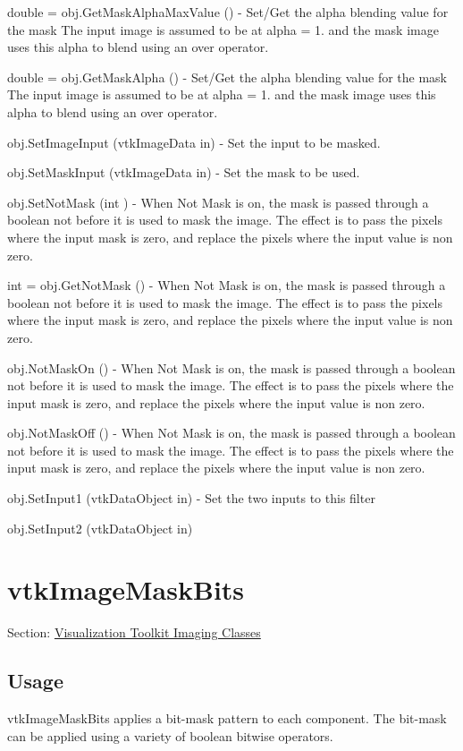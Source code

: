 \begin{DoxyItemize}
\item {\ttfamily double = obj.\-Get\-Mask\-Alpha\-Max\-Value ()} -\/ Set/\-Get the alpha blending value for the mask The input image is assumed to be at alpha = 1. and the mask image uses this alpha to blend using an over operator.  
\item {\ttfamily double = obj.\-Get\-Mask\-Alpha ()} -\/ Set/\-Get the alpha blending value for the mask The input image is assumed to be at alpha = 1. and the mask image uses this alpha to blend using an over operator.  
\item {\ttfamily obj.\-Set\-Image\-Input (vtk\-Image\-Data in)} -\/ Set the input to be masked.  
\item {\ttfamily obj.\-Set\-Mask\-Input (vtk\-Image\-Data in)} -\/ Set the mask to be used.  
\item {\ttfamily obj.\-Set\-Not\-Mask (int )} -\/ When Not Mask is on, the mask is passed through a boolean not before it is used to mask the image. The effect is to pass the pixels where the input mask is zero, and replace the pixels where the input value is non zero.  
\item {\ttfamily int = obj.\-Get\-Not\-Mask ()} -\/ When Not Mask is on, the mask is passed through a boolean not before it is used to mask the image. The effect is to pass the pixels where the input mask is zero, and replace the pixels where the input value is non zero.  
\item {\ttfamily obj.\-Not\-Mask\-On ()} -\/ When Not Mask is on, the mask is passed through a boolean not before it is used to mask the image. The effect is to pass the pixels where the input mask is zero, and replace the pixels where the input value is non zero.  
\item {\ttfamily obj.\-Not\-Mask\-Off ()} -\/ When Not Mask is on, the mask is passed through a boolean not before it is used to mask the image. The effect is to pass the pixels where the input mask is zero, and replace the pixels where the input value is non zero.  
\item {\ttfamily obj.\-Set\-Input1 (vtk\-Data\-Object in)} -\/ Set the two inputs to this filter  
\item {\ttfamily obj.\-Set\-Input2 (vtk\-Data\-Object in)}  
\end{DoxyItemize}\hypertarget{vtkimaging_vtkimagemaskbits}{}\section{vtk\-Image\-Mask\-Bits}\label{vtkimaging_vtkimagemaskbits}
Section\-: \hyperlink{sec_vtkimaging}{Visualization Toolkit Imaging Classes} \hypertarget{vtkwidgets_vtkxyplotwidget_Usage}{}\subsection{Usage}\label{vtkwidgets_vtkxyplotwidget_Usage}
vtk\-Image\-Mask\-Bits applies a bit-\/mask pattern to each component. The bit-\/mask can be applied using a variety of boolean bitwise operators.

